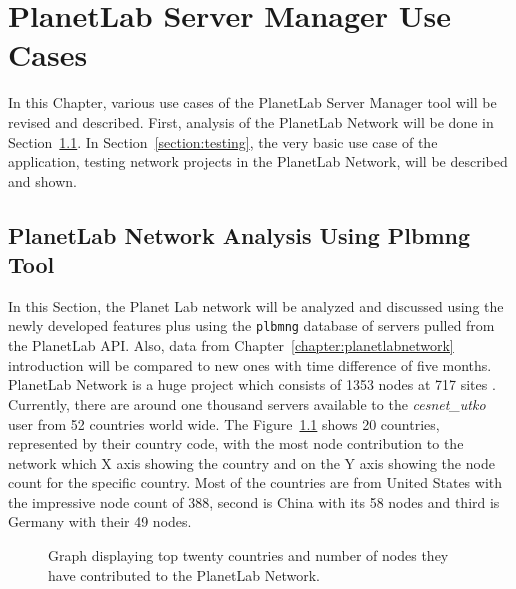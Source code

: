 {{{{{{{\chapter{PlanetLab Server Manager Use Cases}
\label{chapter:usecase}
In this Chapter, various use cases of the PlanetLab Server Manager tool will be revised and described. First, analysis of the PlanetLab Network will be done in Section~\ref{section:analysis}. In Section~\ref{section:testing}, the very basic use case of the application, testing network projects in the PlanetLab Network, will be described and shown.

\section{PlanetLab Network Analysis Using Plbmng Tool}
\label{section:analysis}
In this Section, the Planet Lab network will be analyzed and discussed using the newly developed features plus using the \texttt{plbmng} database of servers pulled from the PlanetLab API. Also, data from Chapter~\ref{chapter:planetlabnetwork} introduction will be compared to new ones with time difference of five months.\\
PlanetLab Network is a huge project which consists of 1353 nodes at 717 sites \cite{planetlabmain}. Currently, there are around one thousand servers available to the \textit{cesnet\_utko} user from 52 countries world wide. The Figure~\ref{fig:allcountriesgraph} shows 20 countries, represented by their country code, with the most node contribution to the network which X axis showing the country and on the Y axis showing the node count for the specific country. Most of the countries are from United States with the impressive node count of 388, second is China with its 58 nodes and third is Germany with their 49 nodes. 

\begin{figure}[H]
	\centering
	\caption{Graph displaying top twenty countries and number of nodes they have contributed to the PlanetLab Network.}
	\label{fig:allcountriesgraph}
\end{figure}

}}}}}}}
